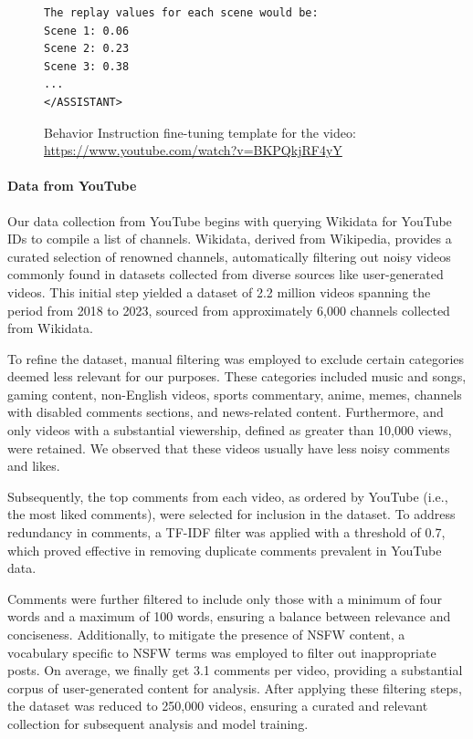 \begin{figure}[!h]
\begin{minipage}[c]{0.71\textwidth}
\begin{lstlisting}
The replay values for each scene would be:
Scene 1: 0.06
Scene 2: 0.23
Scene 3: 0.38
...
</ASSISTANT>

\end{lstlisting}
    \end{minipage}
    \caption{Behavior Instruction fine-tuning template for the video: \url{https://www.youtube.com/watch?v=BKPQkjRF4yY}}
    \label{fig:listing-video-1}
\end{figure}

\paragraph{Data from YouTube} Our data collection from YouTube begins with querying Wikidata \cite{10.1145/2629489} for YouTube IDs to compile a list of channels. Wikidata, derived from Wikipedia, provides a curated selection of renowned channels, automatically filtering out noisy videos commonly found in datasets collected from diverse sources like user-generated videos. This initial step yielded a dataset of 2.2 million videos spanning the period from 2018 to 2023, sourced from approximately 6,000 channels collected from Wikidata.

To refine the dataset, manual filtering was employed to exclude certain categories deemed less relevant for our purposes. These categories included music and songs, gaming content, non-English videos, sports commentary, anime, memes, channels with disabled comments sections, and news-related content. Furthermore, and only videos with a substantial viewership, defined as greater than 10,000 views, were retained. We observed that these videos usually have less noisy comments and likes.

Subsequently, the top comments from each video, as ordered by YouTube (i.e., the most liked comments), were selected for inclusion in the dataset. To address redundancy in comments, a TF-IDF filter was applied with a threshold of 0.7, which proved effective in removing duplicate comments prevalent in YouTube data.

Comments were further filtered to include only those with a minimum of four words and a maximum of 100 words, ensuring a balance between relevance and conciseness. Additionally, to mitigate the presence of NSFW content, a vocabulary specific to NSFW terms \cite{ldnoobw} was employed to filter out inappropriate posts. On average, we finally get 3.1 comments per video, providing a substantial corpus of user-generated content for analysis. After applying these filtering steps, the dataset was reduced to 250,000 videos, ensuring a curated and relevant collection for subsequent analysis and model training.





